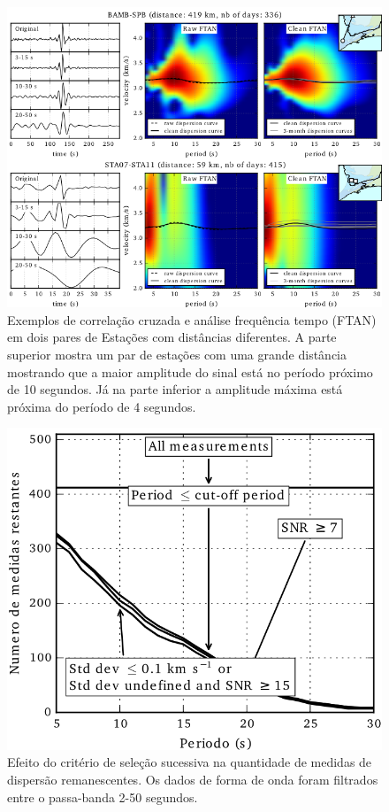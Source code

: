 \begin{figure}[!ht]
\centering
\includegraphics[scale=0.8]{Figs/dist_FTAN.png}
\caption[Exemplos de correlação cruzada e análise tempo/frequência (FTAN) em dois pares de Estações com distâncias diferentes.]{Exemplos de correlação cruzada e análise frequência tempo (FTAN) em dois pares de Estações com distâncias diferentes. A parte superior mostra um par de estações com uma grande distância mostrando que a maior amplitude do sinal está no período próximo de 10 segundos. Já na parte inferior a amplitude máxima está próxima do período de 4 segundos.}
\label{dist_FTAN}
\end{figure}

\begin{figure}[!ht]
\centering
\includegraphics[scale=1]{Figs/corr_selecao.png}
\caption{Efeito do critério de seleção sucessiva na quantidade de medidas de dispersão remanescentes. Os dados de forma de onda foram filtrados entre o passa-banda 2-50 segundos.}
\label{corr_selecao}
\end{figure}


